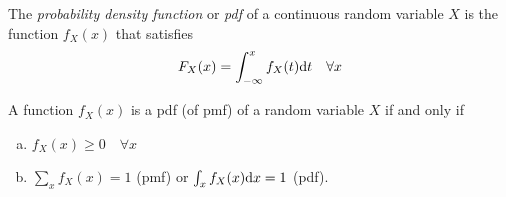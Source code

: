 \begin{definition}
    The \emph{probability density function} or \emph{pdf} of a continuous random variable $X$ is the function $f_X(x)$ that satisfies
    \[
        F_X(x) = \int_{-\infty}^{x}f_X(t) \text{d}{} t \quad \forall x
    \]
\end{definition}

\begin{theorem}
    A function $f_X(x)$ is a pdf (of pmf) of a random variable $X$ if and only if
    \begin{enumerate}[a.]
        \item $f_X(x) \geq 0 \quad \forall x$
        \item $\sum_x f_X(x) = 1$ (pmf) or $\int_x f_X(x)\text{d}{}x = 1$ (pdf).
    \end{enumerate}
\end{theorem}






